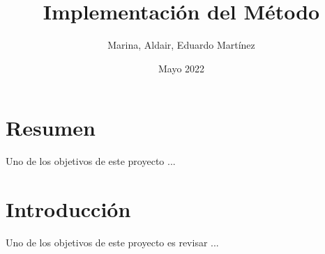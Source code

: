 \documentclass[11pt]{article}
\title{Implementación del Método }
\author{Marina, Aldair, Eduardo Martínez}
\date{Mayo 2022}
\begin{document}
\maketitle

\section{Resumen}

Uno de los objetivos de este proyecto ...


\section{Introducción}

Uno de los objetivos de este proyecto es revisar ...
\end{document}
